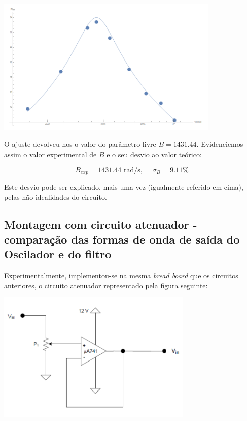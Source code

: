 \documentclass[a4paper,11pt]{report}
\begin{document}
\begin{center}
    \includegraphics[angle=0,width=0.8\textwidth]{Fit.png}
    \label{fig:Fit}
    \end{center}

O ajuste devolveu-nos o valor do parâmetro livre $B=1431.44$. Evidenciemos assim o valor experimental de $B$ e o seu desvio ao valor teórico:

$$B_{exp}=1431.44 \text{ rad/s}, \hspace{15pt} \sigma_B=9.11\%$$ 

Este desvio pode ser explicado, mais uma vez (igualmente referido em cima), pelas não idealidades do circuito.




\subsection{Montagem com circuito atenuador - comparação das formas de onda de saída do Oscilador e do filtro}

Experimentalmente, implementou-se na mesma \textit{bread board} que os circuitos anteriores, o circuito atenuador representado pela figura seguinte:

\begin{center}
    \includegraphics[angle=0,width=0.7\textwidth]{CA.png}
    \label{fig:CA}
    \end{center}
    
\end{document}
